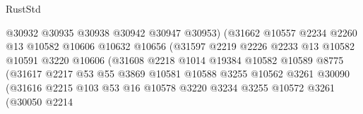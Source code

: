 \begin{lexlean}{RustStd}
\begin{coremodule}
                                      @30932
                                      @30935
                                      @30938
                                      @30942
                                      @30947
                                      @30953)
                                    (@31662
                                      @10557
                                      @2234
                                      @2260
                                      @13
                                      @10582
                                      @10606
                                      @10632
                                      @10656
                                      (@31597
                                        @2219
                                        @2226
                                        @2233
                                        @13
                                        @10582
                                        @10591
                                        @3220
                                        @10606
                                        (@31608
                                          @2218
                                          @1014
                                          @19384
                                          @10582
                                          @10589
                                          @8775
                                          (@31617
                                            @2217
                                            @53
                                            @55
                                            @3869
                                            @10581
                                            @10588
                                            @3255
                                            @10562
                                            @3261
                                            @30090
                                            (@31616
                                              @2215
                                              @103
                                              @53
                                              @16
                                              @10578
                                              @3220
                                              @3234
                                              @3255
                                              @10572
                                              @3261
                                              (@30050
                                                @2214

\end{coremodule}
\end{lexlean}
